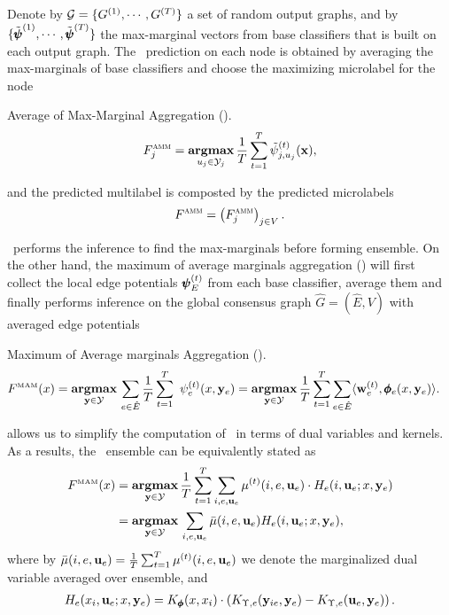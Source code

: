 {%
Denote by  $\mathcal{G}=\{G^{(1)},\cdots,G^{(T)}\}$ a set of random output graphs, and by $\{\tilde{\pmb \psi}^{(1)},\cdots,\tilde{\pmb \psi}^{(T)}\}$ the max-marginal vectors from base classifiers that is built on each output graph.
The \amm\ prediction on each node is obtained by averaging the max-marginals of base classifiers and choose the maximizing microlabel for the node
\begin{definition}{Average of Max-Marginal Aggregation (\amm).}
	\begin{align*}
	F_j^{\text{{\sc amm}}}=\underset{u_j\in\mathcal{Y}_j}{\textbf{argmax}}\,\frac{1}{T}\sum_{t=1}^{T}\tilde{\psi}_{j,u_j}^{(t)}(\mathbf {x}),
	\end{align*}
\end{definition}
and the predicted multilabel is composted by the predicted microlabels
\begin{align*}
	F^{\text{{\sc amm}}}=\left(F_j^{\text{{\sc amm}}}\right)_{j\in V}.
\end{align*}

\amm\ performs the inference to find the max-marginals before forming ensemble. 
On the other hand, the maximum of average marginals aggregation (\mam) will first collect the local edge potentials $\pmb \psi_E^{(t)}$ from each base classifier, average them and finally performs inference on the global consensus graph $\hat{G}=(\hat{E},V)$ with averaged edge potentials
\begin{definition}{Maximum of Average marginals Aggregation (\mam).}
	\begin{align*}
		F^{\text{\tiny MAM}}(x) &= \underset{\vy \in \Ycal }{\argmax}\,\sum_{e\in \hat{E}}\frac{1}{T}\sum_{t=1}^{T}\ \psi^{(t)}_e(x,\vy_e)
		= \underset{\vy \in \Ycal}{\argmax}\, \frac{1}{T} \sum_{t=1}^T \sum_{e\in \hat{E}} \ip{\vw_e^{(t)}}{\phib_e(x,\vy_e)}. %
	\end{align*}
\end{definition}
 allows us to simplify the computation of \mam\ in terms of dual variables and kernels.
As a results, the \mam\ ensemble can be equivalently stated as
\begin{align*}
F^{\text{\tiny MAM}}(x) 
 & =\underset{\mathbf {y} \in \mathcal{Y}}{\textbf{argmax}}\, \frac{1}{T} \sum_{t=1}^T \sum_{i,e,\mathbf {u}_e} \mu^{(t)}(i,e,\mathbf {u}_e) \cdot H_e(i,\mathbf {u}_e;x,\mathbf {y}_e)\nonumber \\
 & =\underset{\mathbf {y} \in \mathcal{Y}}{\textbf{argmax}}\,   \sum_{i,e,\mathbf {u}_e}  \bar\mu(i,e,\mathbf {u}_e) H_e(i,\mathbf {u}_e;x,\mathbf {y}_e),
\end{align*}
where by $\bar\mu(i,e,\mathbf {u}_e)=\frac{1}{T}\sum_{t=1}^T\mu^{(t)}(i,e,\mathbf {u}_e)$ we denote the marginalized dual variable averaged over ensemble, and
\begin{align*}
	H_e(x_i,\mathbf {u}_e;x,\mathbf {y}_e)  = K_{\pmb \phi}(x,x_i)\cdot\left(K_{\Upsilon,e}(\mathbf {y}_{ie},\mathbf {y}_e)-K_{\Upsilon,e}(\mathbf {u}_e,\mathbf {y}_e)\right).
\end{align*}
	
}
